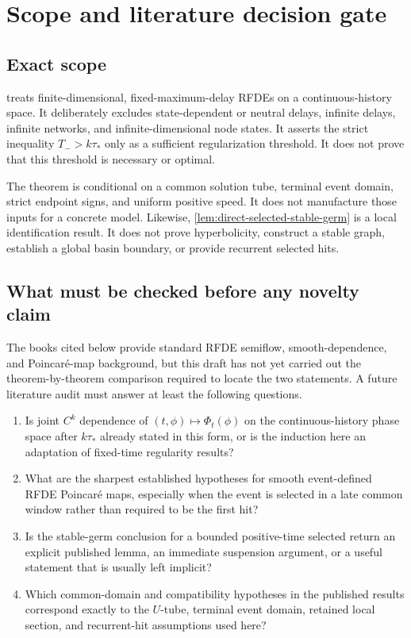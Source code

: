 \section{Scope and literature decision gate}\label{sec:scope-gate}

\subsection{Exact scope}

 treats finite-dimensional,
fixed-maximum-delay RFDEs on a continuous-history space.  It deliberately
excludes state-dependent or neutral delays, infinite delays, infinite
networks, and infinite-dimensional node states.  It asserts the strict
inequality \(T_->k\tau_*\) only as a sufficient regularization threshold.
It does not prove that this threshold is necessary or optimal.

The theorem is conditional on a common solution tube, terminal event domain,
strict endpoint signs, and uniform positive speed.  It does not manufacture
those inputs for a concrete model.  Likewise,
\cref{lem:direct-selected-stable-germ} is a local identification result.  It
does not prove hyperbolicity, construct a stable graph, establish a global
basin boundary, or provide recurrent selected hits.

\subsection{What must be checked before any novelty claim}

The books cited below provide standard RFDE semiflow, smooth-dependence, and
Poincar\'e-map background, but this draft has not yet carried out the
theorem-by-theorem comparison required to locate the two statements.  A
future literature audit must answer at least the following questions.

\begin{enumerate}[label=(L\arabic*)]
\item Is joint \(C^k\) dependence of
  \((t,\phi)\mapsto\Phi_t(\phi)\) on the continuous-history phase space after
  \(k\tau_*\) already stated in this form, or is the induction here an
  adaptation of fixed-time regularity results?
\item What are the sharpest established hypotheses for smooth event-defined
  RFDE Poincar\'e maps, especially when the event is selected in a late common
  window rather than required to be the first hit?
\item Is the stable-germ conclusion for a bounded positive-time selected
  return an explicit published lemma, an immediate suspension argument, or a
  useful statement that is usually left implicit?
\item Which common-domain and compatibility hypotheses in the published
  results correspond exactly to the \(U\)-tube, terminal event domain,
  retained local section, and recurrent-hit assumptions used here?
\end{enumerate}

